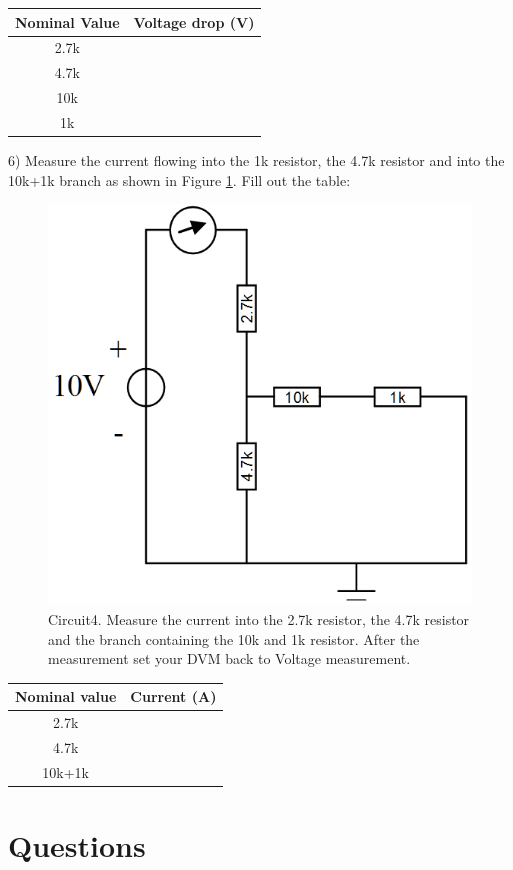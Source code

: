 \documentclass[11pt,letterpaper]{article}
\begin{document}
\begin{center}
\begin{tabular}{|c|c|}
\hline Nominal Value & Voltage drop (V)  \\ 
\hline 2.7k &  \\ 
\hline 4.7k &  \\ 
\hline 10k &  \\ 
\hline 1k &  \\ 
\hline 
\end{tabular} 
\end{center}

6) Measure the current flowing into the 1k resistor, the 4.7k resistor and into the 10k+1k branch as shown in Figure \ref{fig:Lab1_Circuit4}. Fill out the table:

\begin{figure}
\centering
\includegraphics[width=0.6\linewidth]{Lab1_Circuit4}
\caption{Circuit4. Measure the current into the 2.7k resistor, the 4.7k resistor and the branch containing the 10k and 1k resistor. After the measurement set your DVM back to Voltage measurement.}
\label{fig:Lab1_Circuit4}
\end{figure}

\begin{center}
\begin{tabular}{|c|c|}
\hline Nominal value & Current (A)\\ 
\hline 2.7k &  \\ 
\hline 4.7k &  \\ 
\hline 10k+1k &  \\ 
\hline 
\end{tabular} 
\end{center}

\section{Questions}
\end{document}
